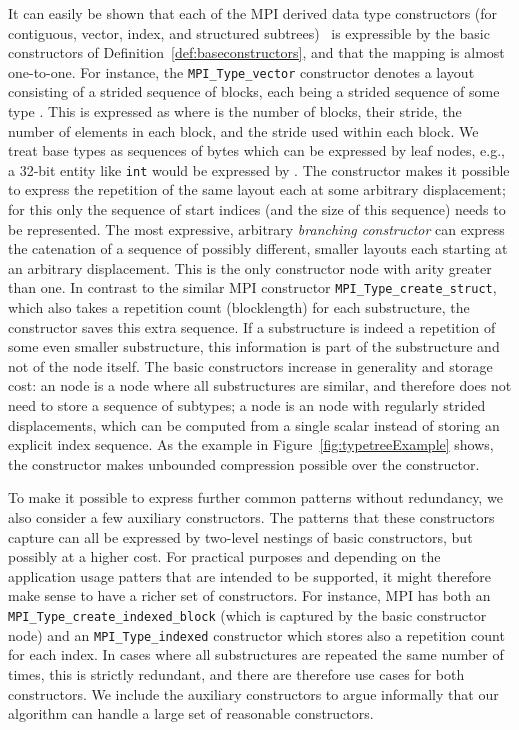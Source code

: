 \documentclass[a4paper,11pt]{article}
\begin{document}
It can easily be shown that each of the MPI derived data type
constructors (for contiguous, vector, index, and structured
subtrees)~\cite[Chapter 4]{MPI-3.0} is expressible by the basic
constructors of Definition~\ref{def:baseconstructors}, and that the
mapping is almost one-to-one. For instance, the
\texttt{MPI\_Type\_vector} constructor denotes a layout consisting of
a strided sequence of blocks, each being a strided sequence of some
type . This is expressed as  where  is
the number of blocks,  their stride,  the number of elements in
each block, and  the stride used within each block. We treat base
types as sequences of bytes which can be expressed by leaf nodes,
e.g., a 32-bit entity like \texttt{int} would be expressed by
.  The  constructor makes it possible to express the
repetition of the same layout  each at some arbitrary displacement;
for this only the sequence of start indices (and the size of this
sequence) needs to be represented. The most expressive, arbitrary
\emph{branching constructor}  can express the catenation of a
sequence of possibly different, smaller layouts each starting at an
arbitrary displacement. This is the only constructor node with arity
greater than one. In contrast to the similar MPI constructor
\texttt{MPI\_\-Type\_\-create\_\-struct}, which also takes a
repetition count (blocklength) for each substructure, the 
constructor saves this extra sequence. If a substructure is indeed a
repetition of some even smaller substructure, this information is part
of the substructure and not of the  node itself. The basic
constructors increase in generality and storage cost: an  node
is a  node where all substructures are similar, and therefore
does not need to store a sequence of subtypes; a  node is an
 node with regularly strided displacements, which can be
computed from a single scalar instead of storing an explicit index
sequence. As the example in Figure~\ref{fig:typetreeExample} shows,
the  constructor makes unbounded compression possible over the
 constructor.

To make it possible to express further common patterns without
redundancy, we also consider a few auxiliary constructors. The
patterns that these constructors capture can all be expressed by
two-level nestings of basic constructors, but possibly at a higher
cost. For practical purposes and depending on the application usage
patters that are intended to be supported, it might therefore make
sense to have a richer set of constructors. For instance, MPI has both
an \texttt{MPI\_\-Type\_\-create\_\-indexed\_\-block} (which is
captured by the  basic constructor node) and an
\texttt{MPI\_\-Type\_\-indexed} constructor which stores also a
repetition count for each index. In cases where all substructures are
repeated the same number of times, this is strictly redundant, and
there are therefore use cases for both constructors. We include the
auxiliary constructors to argue informally that our algorithm can
handle a large set of reasonable constructors.
\end{document}

